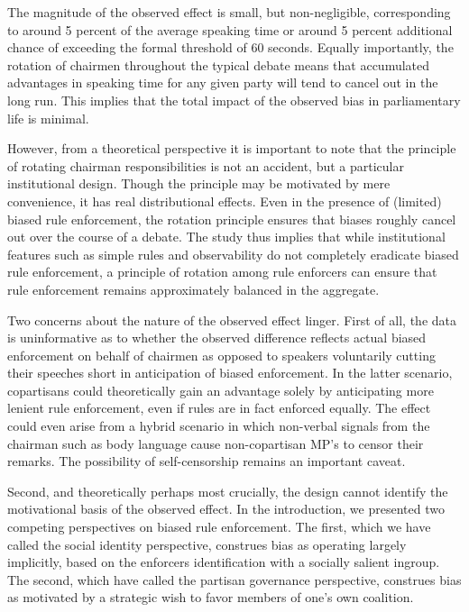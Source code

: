 \documentclass[12pt,a4paper]{article}
\begin{document}
The magnitude of the observed effect is small, but non-negligible, corresponding to around 5 percent of the average speaking time or around 5 percent additional chance of exceeding the formal threshold of 60 seconds. Equally importantly, the rotation of chairmen throughout the typical debate means that accumulated advantages in speaking time for any given party will tend to cancel out in the long run. This implies that the total impact of the observed bias in parliamentary life is minimal. 

However, from a theoretical perspective it is important to note that the principle of rotating chairman responsibilities is not an accident, but a particular institutional design. Though the principle may be motivated by mere convenience, it has real distributional effects. Even in the presence of (limited) biased rule enforcement, the rotation principle ensures that biases roughly cancel out over the course of a debate. The study thus implies that while institutional features such as simple rules and observability do not completely eradicate biased rule enforcement, a principle of rotation among rule enforcers can ensure that rule enforcement remains approximately balanced in the aggregate.

Two concerns about the nature of the observed effect linger. First of all, the data is uninformative as to whether the observed difference reflects actual biased enforcement on behalf of chairmen as opposed to speakers voluntarily cutting their speeches short in anticipation of biased enforcement. In the latter scenario, copartisans could theoretically gain an advantage solely by anticipating more lenient rule enforcement, even if rules are in fact enforced equally. The effect could even arise from a hybrid scenario in which non-verbal signals from the chairman such as body language cause non-copartisan MP's to censor their remarks. The possibility of self-censorship remains an important caveat.

Second, and theoretically perhaps most crucially, the design cannot identify the motivational basis of the observed effect. In the introduction, we presented two competing perspectives on biased rule enforcement. The first, which we have called the social identity perspective, construes bias as operating largely implicitly, based on the enforcers identification with a socially salient ingroup. The second, which have called the partisan governance perspective, construes bias as motivated by a strategic wish to favor members of one's own coalition. 
\end{document}
